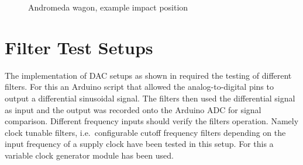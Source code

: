 \begin{figure}[!htb]
  \centering
    \hspace{4em}
  \caption[Andromeda Example Positions]{Andromeda wagon, example impact position%
    \label{fig:andromeda_positions}}
\end{figure}

\section{Filter Test Setups}

The implementation of \ac{DAC} setups as shown in  required the testing of different filters. For this an Arduino script that allowed the analog-to-digital pins to output a differential sinusoidal signal. The filters then used the differential signal as input and the output was recorded onto the Arduino ADC for signal comparison. Different frequency inputs should verify the filters operation. Namely clock tunable filters, i.e.\ configurable cutoff frequency filters depending on the input frequency of a supply clock have been tested in this setup. For this a variable clock generator module has been used.
